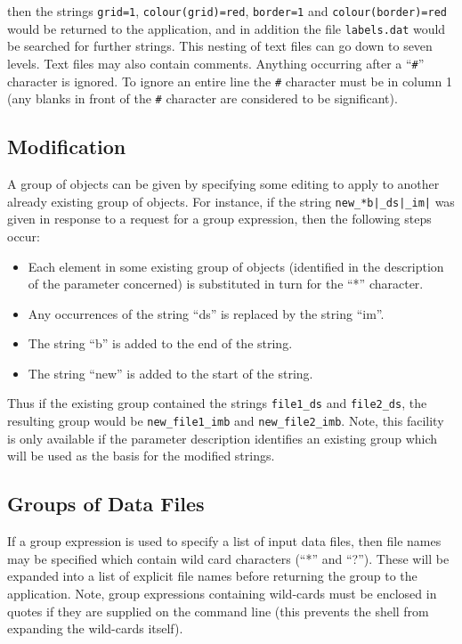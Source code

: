 \documentclass[twoside,11pt]{article}
\renewcommand{\_}{\texttt{\symbol{95}}}
\newcommand{\lsk}{\raisebox{-0.4ex}{\rm *}}
\renewcommand{\lsk}{*}
\begin{document}
then the strings \verb+grid=1+, \verb+colour(grid)=red+, \verb+border=1+
and \verb+colour(border)=red+ would be returned to the 
application, and in addition the file \verb+labels.dat+ would be 
searched for further strings. This nesting of text files can go
down to seven levels. Text files may also contain comments. 
Anything occurring after a ``\verb+#+'' character is ignored. To ignore
an entire line the \verb+#+ character must be in column 1 (any blanks in 
front of the \verb+#+ character are considered to be significant).

\subsection{\label{SEC:MOD}Modification}
A group of objects can be given by specifying some editing to
apply to another already existing group of objects. For instance,
if the string \verb+new_*b|_ds|_im|+ was given in response to a request
for a group expression, then the following steps occur: 

\begin{itemize}
\item   Each element in some existing group of objects (identified in 
     the description of the parameter concerned) is substituted 
     in turn for the ``\lsk'' character.
\item  Any occurrences of the string ``\_ds'' is replaced by the string 
     ``\_im''.
\item  The string ``b'' is added to the end of the string.
\item  The string ``new\_'' is added to the start of the string.
\end{itemize}

Thus if the existing group contained the strings \verb+file1_ds+ and
\verb+file2_ds+, the resulting group would be \verb+new_file1_imb+
and \verb+new_file2_imb+. Note, this facility is only available if
the parameter description identifies an existing group which will be used
as the basis for the modified strings.

\subsection{Groups of Data Files}
\label{SEC:NDF}
If a group expression is used to specify a list of input data files,
then file names may be specified which contain wild card characters 
(``\lsk'' and ``?''). These  will be expanded into a list of explicit 
file names before returning the group to the application. Note,
group expressions containing wild-cards must be enclosed
in quotes if they are supplied on the command line (this prevents the shell
from expanding the wild-cards itself). 
\end{document}
